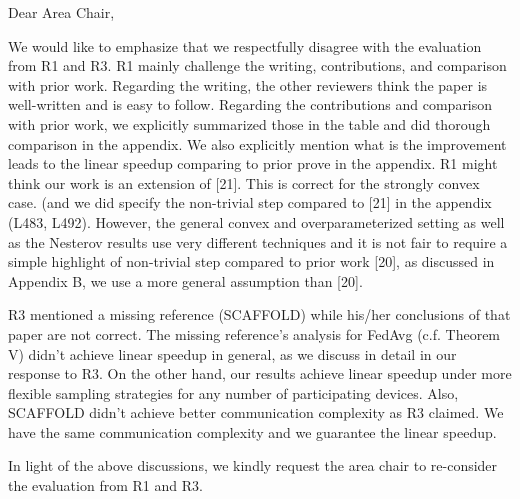 \documentclass{article}
\begin{document}
Dear Area Chair, 

We would like to emphasize that we respectfully disagree with the evaluation from R1 and R3. 
R1 mainly challenge the writing, contributions, and comparison with prior work. Regarding the writing, the other reviewers think the paper is well-written and is easy to follow. Regarding the contributions and comparison with prior work, we explicitly summarized those in the table and did thorough comparison in the appendix.  We also explicitly mention what is the improvement leads to the linear speedup comparing to prior prove in the appendix. 
R1 might think our work is an extension of [21]. This is correct for the strongly convex case. (and we did specify the non-trivial step compared to [21] in the appendix (L483, L492). However,  the general convex and overparameterized setting as well as the Nesterov results use very different techniques and it is not fair to require a simple highlight of non-trivial step compared to prior work [20], as discussed in Appendix B, we use a more general assumption than [20]. 

R3 mentioned a missing reference (SCAFFOLD) while his/her conclusions of that paper are not correct. The missing reference’s analysis for FedAvg (c.f. Theorem V) didn’t achieve linear speedup in general, as we discuss in detail in our response to R3. On the other hand, our results achieve linear speedup under more flexible sampling strategies for any number of participating devices. Also,  SCAFFOLD didn’t achieve better communication complexity as R3 claimed. We have the same communication complexity and we guarantee the linear speedup. 

In light of the above discussions, we kindly request the area chair to re-consider the evaluation from R1 and R3.



    
\end{document}
